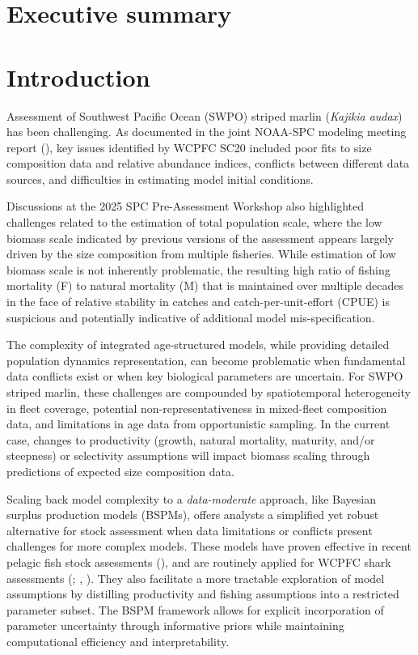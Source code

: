 \documentclass[
  11pt,
]{SCreport}
\begin{document}
\section{Executive summary}\label{executive-summary}

\newpage

\section{Introduction}\label{sec-introduction}

Assessment of Southwest Pacific Ocean (SWPO) striped marlin
(\emph{Kajikia audax}) has been challenging. As documented in the joint
NOAA-SPC modeling meeting report
(), key issues identified by WCPFC SC20 included poor fits to size
composition data and relative abundance indices, conflicts between
different data sources, and difficulties in estimating model initial
conditions.

Discussions at the 2025 SPC Pre-Assessment Workshop also highlighted
challenges related to the estimation of total population scale, where
the low biomass scale indicated by previous versions of the assessment
appears largely driven by the size composition from multiple fisheries.
While estimation of low biomass scale is not inherently problematic, the
resulting high ratio of fishing mortality (F) to natural mortality (M)
that is maintained over multiple decades in the face of relative
stability in catches and catch-per-unit-effort (CPUE) is suspicious and
potentially indicative of additional model mis-specification.

The complexity of integrated age-structured models, while providing
detailed population dynamics representation, can become problematic when
fundamental data conflicts exist or when key biological parameters are
uncertain. For SWPO striped marlin, these challenges are compounded by
spatiotemporal heterogeneity in fleet coverage, potential
non-representativeness in mixed-fleet composition data, and limitations
in age data from opportunistic sampling. In the current case, changes to
productivity (growth, natural mortality, maturity, and/or steepness) or
selectivity assumptions will impact biomass scaling through predictions
of expected size composition data.

Scaling back model complexity to a \emph{data-moderate} approach, like
Bayesian surplus production models (BSPMs), offers analysts a simplified
yet robust alternative for stock assessment when data limitations or
conflicts present challenges for more complex models. These models have
proven effective in recent pelagic fish stock assessments
(), and are
routinely applied for WCPFC shark assessments
(;
,
). They also facilitate a more
tractable exploration of model assumptions by distilling productivity
and fishing assumptions into a restricted parameter subset. The BSPM
framework allows for explicit incorporation of parameter uncertainty
through informative priors while maintaining computational efficiency
and interpretability.
\end{document}
